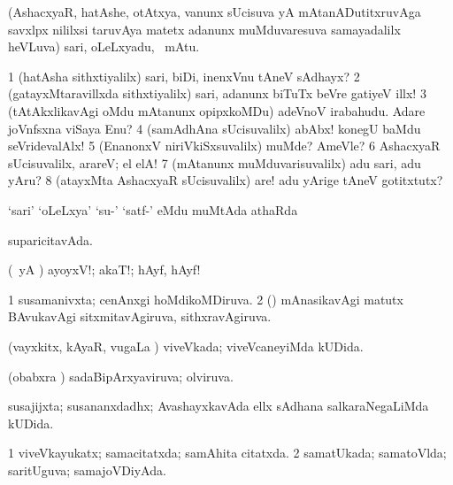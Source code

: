 {{{\bentry
{} 
\gl{\BAavayx}
\expl{}
\bmng
(AshacxyaR, hatAshe, otAtxya, \mo vanunx sUcisuva yA mAtanADutitxruvAga savxlpx nililxsi taruvAya matetx adanunx muMduvaresuva samayadalilx heVLuva) sari, oLeLxyadu, \mo\ mAtu. 
\emng

\noindent 
\gl{\pagu}
\expl{}
\bmng
\bnum
\num{1}  (hatAsha sithxtiyalilx) sari, biDi, inenxVnu tAneV sAdhayx? 
\num{2}  (gatayxMtaravillxda sithxtiyalilx) sari, adanunx biTuTx beVre gatiyeV illx! 
\num{3}  (tAtAkxlikavAgi oMdu mAtanunx opipxkoMDu) adeVnoV irabahudu. Adare joVnfsxna viSaya Enu? 
\num{4}  (samAdhAna sUcisuvalilx) abAbx! konegU baMdu seVridevalAlx! 
\num{5}  (EnanonxV niriVkiSxsuvalilx) muMde? AmeVle? 
\num{6}  AshacxyaR sUcisuvalilx, arareV; el elA! 
\num{7}  (mAtanunx muMduvarisuvalilx) adu sari, adu yAru? 
\num{8}  (atayxMta AshacxyaR sUcisuvalilx) are! adu yArige tAneV gotitxtutx? 
\enum
\emng
\eentry

\bentry
{} 
\gl{\sapUpa}
\expl{}
\bmng
`sari' `oLeLxya' `su-' `satf-' eMdu muMtAda athaRda \sapUpa 
\emng
\eentry

\bentry
{} 
\gl{\gu}
\expl{}
\bmng
suparicitavAda. 
\emng
\eentry

\bentry
{} 
\gl{\BAavayx}
\expl{}
\bmng
(\pArxparx\ yA \hA) ayoyxV!; akaT!; hAyf, hAyf! 
\emng
\eentry

\bentry
{} 
\gl{\gu}
\expl{}
\bmng
\bnum
\num{1} susamanivxta; cenAnxgi hoMdikoMDiruva. 
\num{2} (\mashA) mAnasikavAgi matutx BAvukavAgi sitxmitavAgiruva, sithxravAgiruva. 
\enum
\emng
\eentry

\bentry
{} 
\gl{\gu}
\expl{}
\bmng
(vayxkitx, kAyaR, \mo vugaLa \vi) viveVkada; viveVcaneyiMda kUDida. 
\emng
\eentry

\bentry
{} 
\gl{\gu}
\expl{}
\bmng
(obabxra \vi) sadaBipArxyaviruva; olviruva. 
\emng
\eentry

\bentry
{} 
\gl{\gu}
\expl{}
\bmng
susajijxta; susananxdadhx; AvashayxkavAda ellx sAdhana salkaraNegaLiMda kUDida. 
\emng
\eentry

\bentry
{} 
\gl{\gu}
\expl{}
\bmng
\bnum
\num{1} viveVkayukatx; samacitatxda; samAhita citatxda. 
\num{2} samatUkada; samatoVlda; saritUguva; samajoVDiyAda. 
\enum
\emng
\eentry

}}}
